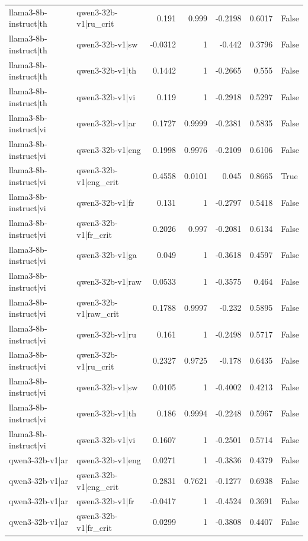 \begin{table}
\begin{tabular}{l l r r r r l}
llama3-8b-instruct|th & qwen3-32b-v1|ru_crit & 0.191 & 0.999 & -0.2198 & 0.6017 & False \\
llama3-8b-instruct|th & qwen3-32b-v1|sw & -0.0312 & 1 & -0.442 & 0.3796 & False \\
llama3-8b-instruct|th & qwen3-32b-v1|th & 0.1442 & 1 & -0.2665 & 0.555 & False \\
llama3-8b-instruct|th & qwen3-32b-v1|vi & 0.119 & 1 & -0.2918 & 0.5297 & False \\
llama3-8b-instruct|vi & qwen3-32b-v1|ar & 0.1727 & 0.9999 & -0.2381 & 0.5835 & False \\
llama3-8b-instruct|vi & qwen3-32b-v1|eng & 0.1998 & 0.9976 & -0.2109 & 0.6106 & False \\
llama3-8b-instruct|vi & qwen3-32b-v1|eng_crit & 0.4558 & 0.0101 & 0.045 & 0.8665 & True \\
llama3-8b-instruct|vi & qwen3-32b-v1|fr & 0.131 & 1 & -0.2797 & 0.5418 & False \\
llama3-8b-instruct|vi & qwen3-32b-v1|fr_crit & 0.2026 & 0.997 & -0.2081 & 0.6134 & False \\
llama3-8b-instruct|vi & qwen3-32b-v1|ga & 0.049 & 1 & -0.3618 & 0.4597 & False \\
llama3-8b-instruct|vi & qwen3-32b-v1|raw & 0.0533 & 1 & -0.3575 & 0.464 & False \\
llama3-8b-instruct|vi & qwen3-32b-v1|raw_crit & 0.1788 & 0.9997 & -0.232 & 0.5895 & False \\
llama3-8b-instruct|vi & qwen3-32b-v1|ru & 0.161 & 1 & -0.2498 & 0.5717 & False \\
llama3-8b-instruct|vi & qwen3-32b-v1|ru_crit & 0.2327 & 0.9725 & -0.178 & 0.6435 & False \\
llama3-8b-instruct|vi & qwen3-32b-v1|sw & 0.0105 & 1 & -0.4002 & 0.4213 & False \\
llama3-8b-instruct|vi & qwen3-32b-v1|th & 0.186 & 0.9994 & -0.2248 & 0.5967 & False \\
llama3-8b-instruct|vi & qwen3-32b-v1|vi & 0.1607 & 1 & -0.2501 & 0.5714 & False \\
qwen3-32b-v1|ar & qwen3-32b-v1|eng & 0.0271 & 1 & -0.3836 & 0.4379 & False \\
qwen3-32b-v1|ar & qwen3-32b-v1|eng_crit & 0.2831 & 0.7621 & -0.1277 & 0.6938 & False \\
qwen3-32b-v1|ar & qwen3-32b-v1|fr & -0.0417 & 1 & -0.4524 & 0.3691 & False \\
qwen3-32b-v1|ar & qwen3-32b-v1|fr_crit & 0.0299 & 1 & -0.3808 & 0.4407 & False \\

\end{tabular}
\end{table}
